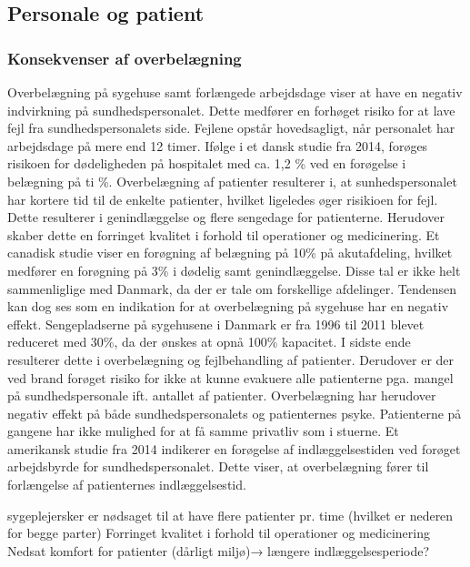 \subsection{Personale og patient}

\subsubsection{Konsekvenser af overbelægning}

Overbelægning på sygehuse samt forlængede arbejdsdage viser at have en negativ indvirkning på sundhedspersonalet. Dette medfører en forhøget risiko for at lave fejl fra sundhedspersonalets side. Fejlene opstår hovedsagligt, når personalet har arbejdsdage på mere end 12 timer.\citep{Dinges2004} Ifølge i et dansk studie fra 2014, forøges risikoen for dødeligheden på hospitalet med ca. 1,2 \% ved en forøgelse i belægning på ti \%.\citep{Madsen2014} Overbelægning af patienter resulterer i, at sunhedspersonalet har kortere tid til de enkelte patienter, hvilket ligeledes øger risikioen for fejl. Dette resulterer i genindlæggelse og flere sengedage for patienterne. Herudover skaber dette en forringet kvalitet i forhold til operationer og medicinering. Et canadisk studie viser en forøgning af belægning på 10\% på akutafdeling, hvilket medfører en forøgning på 3\% i dødelig samt genindlæggelse.\citep{McCusker2014} Disse tal er ikke helt sammenliglige med Danmark, da der er tale om forskellige afdelinger. Tendensen kan dog ses som en indikation for at overbelægning på sygehuse har en negativ effekt.
Sengepladserne på sygehusene i Danmark er fra 1996 til 2011 blevet reduceret med 30\%, da der ønskes at opnå 100\% kapacitet.\citep{Madsen2014} I sidste ende resulterer dette i overbelægning og fejlbehandling af patienter. Derudover er der ved brand forøget risiko for ikke at kunne evakuere alle patienterne pga. mangel på sundhedspersonale ift. antallet af patienter. 
Overbelægning har herudover negativ effekt på både sundhedspersonalets og patienternes psyke. Patienterne på gangene har ikke mulighed for at få samme privatliv som i stuerne.\citep{Madsen2014}  Et amerikansk studie fra 2014 indikerer en forøgelse af indlæggelsestiden ved forøget arbejdsbyrde for sundhedspersonalet\citep{Elliott2014}. Dette viser, at overbelægning fører til forlængelse af patienternes indlæggelsestid. 


sygeplejersker er nødsaget til at have flere patienter pr. time (hvilket er nederen for begge parter)
Forringet kvalitet i forhold til operationer og medicinering 
Nedsat komfort for patienter (dårligt miljø)→ længere indlæggelsesperiode?
 
    